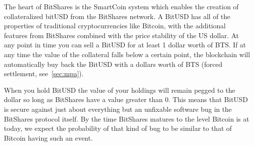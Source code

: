 The heart of BitShares is the SmartCoin system which enables the creation of
collateralized bitUSD from the BitShares network. A BitUSD has all of the
properties of traditional cryptocurrencies like Bitcoin, with the additional
features from BitShares combined with the price stability of the US dollar. At
any point in time you can sell a BitUSD for at least 1 dollar worth of BTS. If
at any time the value of the collateral falls below a certain point, the
blockchain will automatically buy back the BitUSD with a dollars worth of BTS
(forced settlement, see~\cref{sec:mpa}).

When you hold BitUSD the value of your holdings will remain pegged to the
dollar so long as BitShares have a value greater than $0$. This means that
BitUSD is secure against just about everything but an unfixable software bug in
the BitShares protocol itself. By the time BitShares matures to the level
Bitcoin is at today, we expect the probability of that kind of bug to be
similar to that of Bitcoin having such an event.
